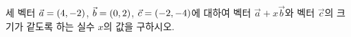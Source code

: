 세 벡터 $\vec{a}=(4{,}\mkern3mu\mathopen{}-2)$, $\vec{b}=(0{,}\mkern3mu\mathopen{}2)$, $\vec{c}=(-2{,}\mkern3mu\mathopen{}-4)$에 대하여 벡터 $\vec{a}+x\vec{b}$와 벡터 $\vec{c}$의 크기가 같도록 하는 실수 $x$의 값을 구하시오. 
